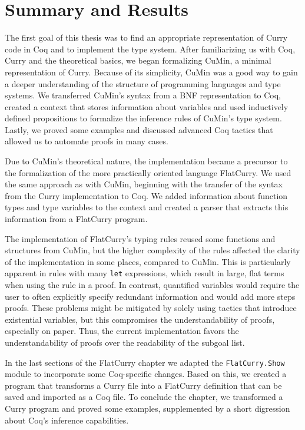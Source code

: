 \documentclass[paper = a4, fleqn, twoside]{scrreprt}
\begin{document}
\section{Summary and Results}
The first goal of this thesis was to find an appropriate representation of Curry code in Coq and to implement the type system. After familiarizing us with Coq, Curry and the theoretical basics, we began formalizing CuMin, a minimal representation of Curry. Because of its simplicity, CuMin was a good way to gain a deeper understanding of the structure of programming languages and type systems. We transferred CuMin's syntax from a BNF representation to Coq, created a context that stores information about variables and used inductively defined propositions to formalize the inference rules of CuMin's type system. Lastly, we proved some examples and discussed advanced Coq tactics that allowed us to automate proofs in many cases.\\
\par \noindent
Due to CuMin's theoretical nature, the implementation became a precursor to the formalization of the more practically oriented language FlatCurry. We used the same approach as with CuMin, beginning with the transfer of the syntax from the Curry implementation to Coq. We added information about function types and type variables to the context and created a parser that extracts this information from a FlatCurry program.
\par
The implementation of FlatCurry's typing rules reused some functions and structures from CuMin, but the higher complexity of the rules affected the clarity of the implementation in some places, compared to CuMin. This is particularly apparent in rules with many \texttt{let} expressions, which result in large, flat terms when using the rule in a proof. In contrast, quantified variables would require the user to often explicitly specify redundant information and would add more steps proofs. These problems might be mitigated by solely using tactics that introduce existential variables, but this compromises the understandability of proofs, especially on paper. Thus, the current implementation favors the understandability of proofs over the readability of the subgoal list.
\par
In the last sections of the FlatCurry chapter we adapted the \texttt{FlatCurry.Show} module to incorporate some Coq-specific changes. Based on this, we created a program that transforms a Curry file into a FlatCurry definition that can be saved and imported as a Coq file. To conclude the chapter, we transformed a Curry program and proved some examples, supplemented by a short digression about Coq's inference capabilities.\\
\end{document}
